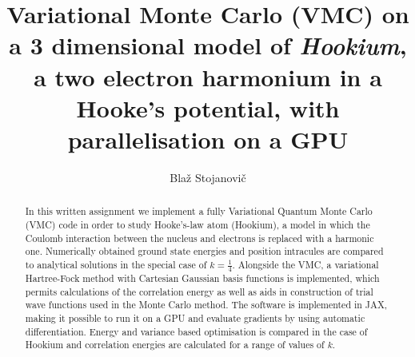 \documentclass[final,3p,times,twocolumn]{elsarticle}
\begin{document}
	
	\begin{frontmatter}
		
		
		
		\title{Variational Monte Carlo (VMC) on a 3 dimensional model of \emph{Hookium}, a two electron harmonium in a Hooke’s potential, with parallelisation on a GPU}
		
		
		\author{Bla\v z Stojanovi\v c}
		
		\address{Cavendish Laboratory, Department of Physics, J J Thomson
			Avenue, Cambridge. CB3 0HE}
		
		\begin{abstract}
			In this written assignment we implement a fully Variational Quantum Monte Carlo (VMC) code in order to study Hooke's-law atom (Hookium), a model in which the Coulomb interaction between the nucleus and electrons is replaced with a harmonic one. Numerically obtained ground state energies and position intracules are compared to analytical solutions in the special case of $k=\frac{1}{4}$. Alongside the VMC, a variational Hartree-Fock method with Cartesian Gaussian basis functions is implemented, which permits calculations of the correlation energy as well as aids in construction of trial wave functions used in the Monte Carlo method. The software is implemented in JAX, making it possible to run it on a GPU and evaluate gradients by using automatic differentiation. Energy and variance based optimisation is compared in the case of Hookium and correlation energies are calculated for a range of values of $k$. 
		\end{abstract}
	\end{frontmatter}
	
\end{document}
